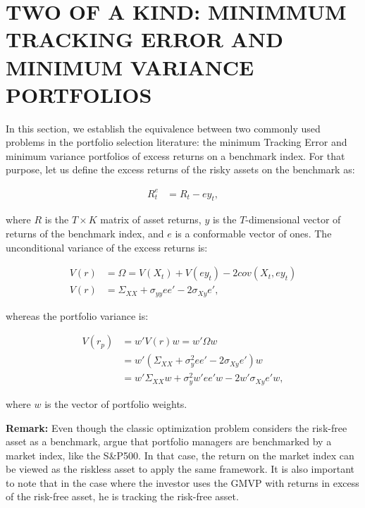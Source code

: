 \documentclass[12pt,oneside,a4paper]{memoir}
\begin{document}
\section{TWO OF A KIND: MINIMMUM TRACKING ERROR AND MINIMUM VARIANCE PORTFOLIOS}\label{section:theory}

In this section, we establish the equivalence between two commonly used problems in the portfolio selection literature: the minimum Tracking Error and minimum variance portfolios of excess returns on a benchmark index. For that purpose, let us define the excess returns of the risky assets on the benchmark as:

\vspace{-18 pt}
\begin{align*}
R^{e}_{t} &= R_{t} - e y_{t},
\end{align*}

\noindent
where $R$ is the $T \times K$ matrix of asset returns, $y$ is the $T$-dimensional vector of returns of the benchmark index, and $e$ is a conformable vector of ones. The unconditional variance of the excess returns is:

\vspace{-18 pt}
\begin{align*}
V(r) &= \Omega = V(X_{t}) + V(e y_{t}) - 2cov(X_{t}, e y_{t})
\\
V(r) &= \Sigma_{XX} + \sigma_{yy} ee' - 2 \sigma_{Xy} e',
\end{align*}

\noindent
whereas the portfolio variance is:

\vspace{-18 pt}
\begin{align*}
V(r_{p}) &= w'V(r)w = w'\Omega w
\\
&= w'(\Sigma_{XX} + \sigma^{2}_{y}ee' - 2\sigma_{Xy}e')w
\\
&= w'\Sigma_{XX}w + \sigma^{2}_{y}w'ee'w - 2w'\sigma_{Xy}e'w,
\end{align*}

\noindent
where $w$ is the vector of portfolio weights. 

\vspace{12pt}
\textbf{Remark:}
Even though the classic optimization problem considers the risk-free asset as a benchmark,  argue that portfolio managers are benchmarked by a market index, like the S\&P500.
In that case, the return on the market index can be viewed as the riskless asset to apply the same framework.
It is also important to note that in the case where the investor uses the GMVP with returns in excess of the risk-free asset, he is tracking the risk-free asset.
\end{document}
